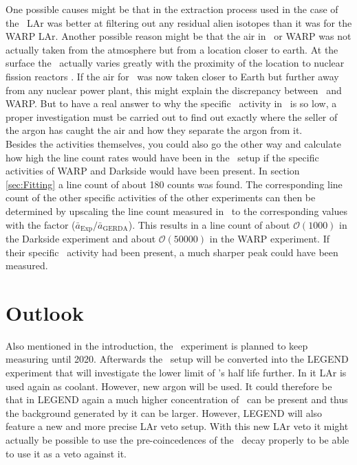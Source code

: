 \documentclass[encoding=utf8,british]{tumphthesis}
\begin{document}
One possible causes might be that in the extraction process used in the case of the \gerda\ LAr was better at filtering out any residual alien isotopes than it was for the WARP LAr.
Another possible reason might be that the air in \gerda\ or WARP was not actually taken from the atmosphere but from a location closer to earth.
At the surface the \Kr\ actually varies greatly with the proximity of the location to nuclear fission reactors \cite{weiss_mesoscale_1986}.
If the air for \gerda\ was now taken closer to Earth but further away from any nuclear power plant, this might explain the discrepancy between \gerda\ and WARP. 
But to have a real answer to why the specific \Kr\ activity in \gerda\ is so low, a proper investigation must be carried out to find out exactly where the seller of the argon has caught the air and how they separate the argon from it.
\\

Besides the activities themselves, you could also go the other way and calculate how high the line count rates would have been in the \gerda\ setup if the specific activities of WARP and Darkside would have been present.
In section \ref{sec:Fitting} a line count of about 180 counts was found.
The corresponding line count of the other specific activities of the other experiments can then be determined by upscaling the line count measured in \gerda\ to the corresponding values with the factor ($\bar{a}_{\mathrm{Exp}}/\bar{a}_{\mathrm{GERDA}}$).
This results in a line count of about $\mathcal{O}(1000)$ in the Darkside experiment and about $\mathcal{O}(50000)$ in the WARP experiment.
If their specific \Kr\ activity had been present, a much sharper peak could have been measured.


\section{Outlook}
Also mentioned in the introduction, the \gerda\ experiment is planned to keep measuring until 2020.
Afterwards the \gerda\ setup will be converted into the LEGEND experiment that will investigate the lower limit of 's half life further.
In it LAr is used again as coolant.
However, new argon will be used.
It could therefore be that in LEGEND again a much higher concentration of \Kr\ can be present and thus the background generated by it can be larger.
However, LEGEND will also feature a new and more precise LAr veto setup.
With this new LAr veto it might  actually be possible to use the pre-coincedences of the \Kr\ decay properly to be able to use it as a veto against it. 
\\
\end{document}
